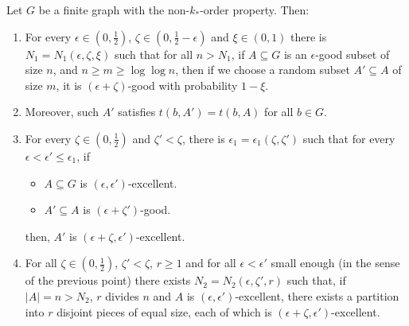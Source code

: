     \lemma[Claim 5.13]\label{claim_5.13}
        Let $G$ be a finite graph with the non-$k_{*}$-order property.
        Then:
        \begin{enumerate}[label=(\alph*), ref=\alph*]
            \item \label{itm:5.13.1} For every $\epsilon \in \left(0, \frac{1}{2}\right)$,
                $\zeta \in \left(0, \frac{1}{2} - \epsilon \right)$ and $\xi \in \left(0, 1 \right)$ there is
                $N_1 = N_1\left(\epsilon, \zeta, \xi \right)$ such that for all $n > N_1$, if $A \subseteq G$ is an
                $\epsilon$-good subset of size $n$, and $n \geq m \geq \log \log n$, %
                then if we choose a random subset $A' \subseteq A$ of size $m$, it is $(\epsilon + \zeta)$-good
                with probability $1-\xi$.
            \item \label{itm:5.13.1*} Moreover, such $A'$ satisfies $t(b, A') = t(b, A)$ for all $b \in G$.
            \item \label{itm:5.13.2} For every $\zeta \in \left(0, \frac{1}{2}\right)$ and $\zeta' < \zeta$, there is
                $\epsilon_1 = \epsilon_1(\zeta, \zeta')$ such that for every $\epsilon < \epsilon' \leq \epsilon_1$, if
                \begin{itemize}
                    \item $A \subseteq G$ is $\left( \epsilon, \epsilon' \right)$-excellent.
                    \item $A' \subseteq A$ is $\left( \epsilon + \zeta' \right)$-good.
                \end{itemize}
                then, $A'$ is $\left( \epsilon + \zeta, \epsilon' \right)$-excellent.
            \item \label{itm:5.13.3} For all $\zeta \in \left(0, \frac{1}{2}\right)$, $\zeta' < \zeta$, $r \geq 1$ and for all
                $\epsilon < \epsilon'$ small enough (in the sense of the previous point) there exists
                $N_2 = N_2\left(\epsilon, \zeta', r \right)$ such that, if $|A| = n > N_2$, $r$ divides $n$ and $A$ is
                $\left( \epsilon, \epsilon' \right)$-excellent, there exists a partition into $r$ disjoint pieces of equal
                size, each of which is $\left( \epsilon + \zeta, \epsilon' \right)$-excellent.
        \end{enumerate}
